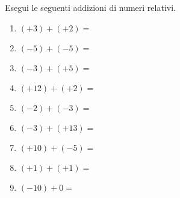 \begin{esercizio}
 \label{ese:2.6}
Esegui le seguenti addizioni di numeri relativi.
 \begin{multicols}{3}
 \begin{enumerate}[noitemsep, label=(\alph*)]
 \item \((+3)+(+2) =~\)
 \item \((-5)+(-5) =~\)
 \item \((-3)+(+5) =~\)
 \item \((+12)+(+2) =\)
 \item \((-2)+(-3) =\)
 \item \((-3)+(+13) =\)
 \item \((+10)+(-5) =\)
 \item \((+1)+(+1) =\)
 \item \((-10)+0 =\)
 \end{enumerate}
 \end{multicols}
\end{esercizio}





